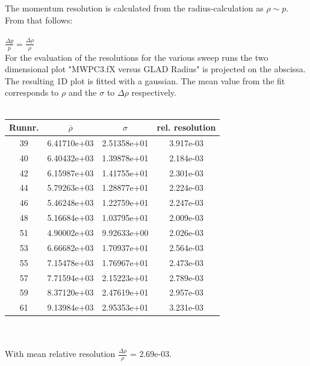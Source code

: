 \documentclass[12pt, letterpaper]{article}
\begin{document}
The momentum resolution is calculated from the radius-calculation as $\rho \sim p$. From that follows:\\
\\
$\frac{\Delta p}{p} = \frac{\Delta\rho}{\rho}$
\\
For the evaluation of the resolutions for the various sweep runs the two dimensional plot "MWPC3.fX versus GLAD Radius" is projected on the abscissa. The resulting 1D plot is fitted with a gaussian. The mean value from the fit corresponds to $\rho$ and the $\sigma$ to $\Delta\rho$ respectively.\\
\\
\begin{tabular}{|c|c|c|c|}
\hline
Runnr. & $\overline{\rho}$ & $\sigma$ & rel. resolution \\
\hline
39     &         6.41710e+03    &     2.51358e+01    &     3.917e-03\\
40     &         6.40432e+03    &     1.39878e+01    &     2.184e-03\\
42     &         6.15987e+03    &     1.41755e+01    &     2.301e-03\\
44     &         5.79263e+03    &     1.28877e+01    &     2.224e-03\\
46     &         5.46248e+03    &     1.22759e+01    &     2.247e-03\\
48     &         5.16684e+03    &     1.03795e+01    &     2.009e-03\\
51     &         4.90002e+03    &     9.92633e+00    &     2.026e-03\\
53     &         6.66682e+03    &     1.70937e+01    &     2.564e-03\\
55     &         7.15478e+03    &     1.76967e+01    &     2.473e-03\\
57     &         7.71594e+03    &     2.15223e+01    &     2.789e-03\\
59     &         8.37120e+03    &     2.47619e+01    &     2.957e-03\\
61     &         9.13984e+03    &     2.95353e+01    &     3.231e-03\\
\hline

\end{tabular}
\\
\\
\newline
With mean relative resolution $\frac{\Delta\rho}{\rho}$ = 2.69e-03.
\end{document}
